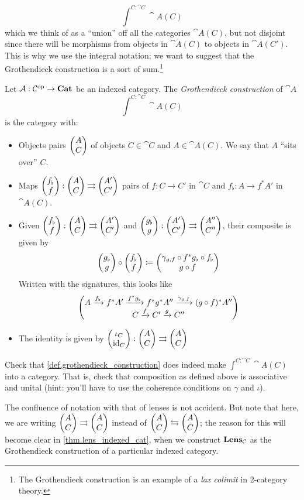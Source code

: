 \documentclass[DynamicalBook]{subfiles}
\begin{document}
{$$\int^{C : \cat{C}} \cat{A}(C)$$
which we think of as a ``union'' off all the categories $\cat{A}(C)$, but not
disjoint since there will be morphisms from objects in $\cat{A}(C)$ to objects
in $\cat{A}(C')$. This is why we use the integral notation; we want to suggest
that the Grothendieck construction is a sort of sum.\footnote{The Grothendieck
  construction is an example of a \emph{lax colimit} in 2-category theory.}
\begin{definition}\label{def.grothendieck_construction}
  Let $\mathcal{A} : \mathcal{C}^{\textnormal{op}} \to \textbf{Cat}$ be an indexed category. The
  \emph{Grothendieck construction} of $\cat{A}$
  $$\int^{C : \cat{C}} \cat{A}(C)$$
  is the category with:
  \begin{itemize}
    \item Objects pairs $\begin{pmatrix}{A} \\ {C} \end{pmatrix}$ of objects $C \in \cat{C}$ and $A \in
      \cat{A}(C)$. We say that $A$ ``sits over'' $C$.
    \item Maps $\begin{pmatrix}{f_{\flat}} \\ {f} \end{pmatrix} : \begin{pmatrix}{A} \\ {C} \end{pmatrix} \rightrightarrows
      \begin{pmatrix}{A'} \\ {C'} \end{pmatrix}$ pairs of $f : C \to C'$ in $\cat{C}$ and $f_{\flat} :
      A \to f^{\ast}A'$ in $\cat{A}(C)$.
    \item Given $\begin{pmatrix}{f_{\flat}} \\ {f} \end{pmatrix} : \begin{pmatrix}{A} \\ {C} \end{pmatrix} \rightrightarrows
      \begin{pmatrix}{A'} \\ {C'} \end{pmatrix}$ and $\begin{pmatrix}{g_{\flat}} \\ {g} \end{pmatrix} : \begin{pmatrix}{A'} \\ {C'} \end{pmatrix} \rightrightarrows
      \begin{pmatrix}{A''} \\ {C''} \end{pmatrix}$, their composite is given by
      $$\begin{pmatrix}{g_{\flat}} \\ {g} \end{pmatrix} \circ \begin{pmatrix}{f_{\flat}} \\ {f} \end{pmatrix} \coloneqq \begin{pmatrix}{\gamma_{g, f}
        \circ f^{\ast}g_{\flat}
      \circ f_{\flat}} \\ {g \circ f} \end{pmatrix}$$
    Written with the signatures, this looks like
    $$\begin{pmatrix}{A \xrightarrow{f_{\flat}} f^{\ast}A' \xrightarrow{f^{\ast}g_{\flat}}
      f^{\ast}g^{\ast}A'' \xrightarrow{\gamma_{g, f}} (g \circ f)^\ast A''} \\ {C \xrightarrow{f} C' \xrightarrow{g} C''} \end{pmatrix}$$
    \item The identity is given by $\begin{pmatrix}{\iota_C} \\ {\mathrm{id}_C} \end{pmatrix} : \begin{pmatrix}{A} \\ {C} \end{pmatrix}
      \rightrightarrows \begin{pmatrix}{A} \\ {C} \end{pmatrix}$
  \end{itemize}
\end{definition}

\begin{exercise}
  Check that \cref{def.grothendieck_construction} does indeed make $\int^{C :
    \cat{C}} \cat{A}(C)$ into a category. That is, check that composition as
  defined above is associative and unital (hint: you'll have to use the
  coherence conditions on $\gamma$ and $\iota$).
\end{exercise}

The confluence of notation with that of lenses is not accident. But note that
here, we are writing $\begin{pmatrix}{A} \\ {C} \end{pmatrix} \rightrightarrows \begin{pmatrix}{A} \\ {C} \end{pmatrix}$ instead of
$\begin{pmatrix}{A} \\ {C} \end{pmatrix} \leftrightarrows \begin{pmatrix}{A} \\ {C} \end{pmatrix}$; the reason for this will become clear in
\cref{thm.lens_indexed_cat}, when we construct $\textbf{Lens}_{\mathcal{C}}$ as the
Grothendieck construction of a particular indexed category.



}
\end{document}
